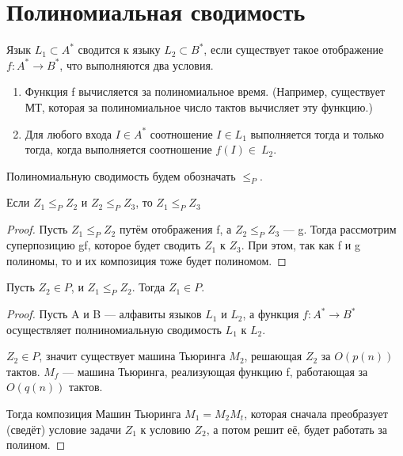 \section{Полиномиальная сводимость}

\begin{definition}
	Язык $L_1 \subset A^*$ сводится к языку $ L_2 \subset B^*$, если
	существует такое отображение $f: A^* \to B^*$, что выполняются два
	условия.
	\begin{enumerate}
		\item Функция f вычисляется за полиномиальное время. (Например,
			существует МТ, которая за полиномиальное число тактов
			вычисляет эту функцию.)
		\item Для любого входа $I\in A^*$ соотношение $I\in L_1$
			выполняется тогда и только тогда, когда выполняется
			соотношение  $f(I)\in~L_2.$
	\end{enumerate}
\end{definition}

Полиномиальную сводимость будем обозначать $\le_P$.


\begin{lemma}
	Если $Z_1 \le_P Z_2$ и  $Z_2 \le_P Z_3$, то $Z_1 \le_P Z_3$
\end{lemma}
\begin{proof}
	Пусть $Z_1 \le_P Z_2$ путём отображения f, а  $Z_2 \le_P Z_3$ --- g.
	Тогда рассмотрим суперпозицию gf, которое будет сводить $Z_1$ к  $Z_3$.
	При этом, так как f и g полиномы, то и их композиция тоже будет
	полиномом.
\end{proof}
\begin{lemma}
	Пусть $Z_2 \in P$, и  $Z_1 \le_P Z_2$. Тогда  $Z_1 \in P$.
\end{lemma}
\begin{proof}
	Пусть A и B --- алфавиты языков $L_1$ и $L_2$, а функция $f: A^* \to
	B^*$ осуществляет полниномиальную сводимость $L_1$ к $L_2$.

	$Z_2\in P$, значит существует машина Тьюринга $M_2$, решающая  $Z_2$ за
	$O(p(n))$ тактов.
	$M_f$ --- машина Тьюринга, реализующая функцию f, работающая за
	$O(q(n))$ тактов.
	
	Тогда композиция Машин Тьюринга $M_1 = M_2M_t$, которая сначала
	преобразует (сведёт) условие задачи $Z_1$ к условию $Z_2$, а потом решит
	её, будет работать за полином.

\end{proof}

